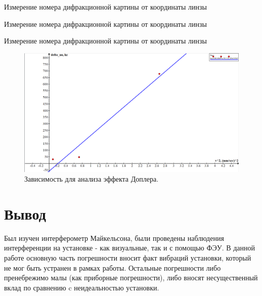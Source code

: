 \begin{table}[h!]
	\centering
	
	\caption{Измерение номера дифракционной картины от координаты линзы}
	\label{nu1}
\end{table}

\begin{table}[h!]
	\centering
	
	\caption{Измерение номера дифракционной картины от координаты линзы}
	\label{nu2}
\end{table}

\begin{table}[h!]
	\centering
	
	\caption{Измерение номера дифракционной картины от координаты линзы}
	\label{nu3}
\end{table}


\begin{figure}[h!]
  \centering
  \includegraphics[width=1\linewidth]{pics/lab_4_2_4_2.png}
  \caption{Зависимость для анализа эффекта Доплера.}
  \label{}
\end{figure}

\section{Вывод}
Был изучен интерферометр Майкельсона, были проведены наблюдения интерференции на установке - как визуальные, так и с помощью ФЭУ. В данной работе основную часть погрешности вносит факт вибраций установки, который не мог быть устранен в рамках работы. Остальные погрешности либо пренебрежимо малы (как приборные погрешности), либо вносят несущественный вклад по сравнению c неидеальностью установки.

